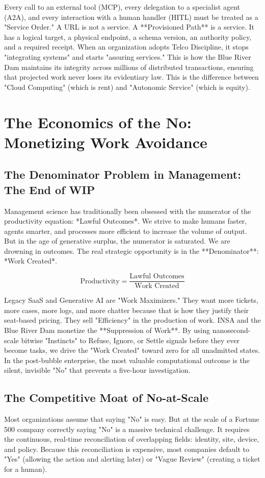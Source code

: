 \documentclass[12pt,a4paper,oneside]{book}
\begin{document}
Every call to an external tool (MCP), every delegation to a specialist agent (A2A), and every interaction with a human handler (HITL) must be treated as a "Service Order." A URL is not a service. A **Provisioned Path** is a service. It has a logical target, a physical endpoint, a schema version, an authority policy, and a required receipt. When an organization adopts Telco Discipline, it stops "integrating systems" and starts "assuring services." This is how the Blue River Dam maintains its integrity across millions of distributed transactions, ensuring that projected work never loses its evidentiary law. This is the difference between "Cloud Computing" (which is rent) and "Autonomic Service" (which is equity).

\chapter{The Economics of the No: Monetizing Work Avoidance}

\section{The Denominator Problem in Management: The End of WIP}
Management science has traditionally been obsessed with the numerator of the productivity equation: *Lawful Outcomes*. We strive to make humans faster, agents smarter, and processes more efficient to increase the volume of output. But in the age of generative surplus, the numerator is saturated. We are drowning in outcomes. The real strategic opportunity is in the **Denominator**: *Work Created*.

\begin{equation}
\text{Productivity} = \frac{\text{Lawful Outcomes}}{\text{Work Created}}
\end{equation}

Legacy SaaS and Generative AI are "Work Maximizers." They want more tickets, more cases, more logs, and more chatter because that is how they justify their seat-based pricing. They sell "Efficiency" in the production of work. INSA and the Blue River Dam monetize the **Suppression of Work**. By using nanosecond-scale bitwise "Instincts" to Refuse, Ignore, or Settle signals before they ever become tasks, we drive the "Work Created" toward zero for all unadmitted states. In the post-bubble enterprise, the most valuable computational outcome is the silent, invisible "No" that prevents a five-hour investigation.

\section{The Competitive Moat of No-at-Scale}
Most organizations assume that saying "No" is easy. But at the scale of a Fortune 500 company correctly saying "No" is a massive technical challenge. It requires the continuous, real-time reconciliation of overlapping fields: identity, site, device, and policy. Because this reconciliation is expensive, most companies default to "Yes" (allowing the action and alerting later) or "Vague Review" (creating a ticket for a human). 
\end{document}
